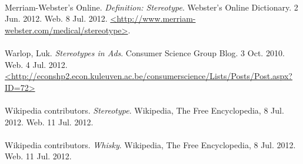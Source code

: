\paragraph{}
Merriam-Webster's Online. \emph{Definition: Stereotype}. Webster's Online Dictionary. 2 Jun. 2012. Web. 8 Jul. 2012. \url{<http://www.merriam-webster.com/medical/stereotype>}.
\paragraph{}
Warlop, Luk. \emph{Stereotypes in Ads}. Consumer Science Group Blog. 3 Oct. 2010. Web. 4 Jul. 2012. \url{<http://econshp2.econ.kuleuven.ac.be/consumerscience/Lists/Posts/Post.aspx?ID=72>}
\paragraph{}
Wikipedia contributors. \emph{Stereotype}. Wikipedia, The Free Encyclopedia, 8 Jul. 2012. Web. 11 Jul. 2012.
\paragraph{}
Wikipedia contributors. \emph{Whisky}. Wikipedia, The Free Encyclopedia, 8 Jul. 2012. Web. 11 Jul. 2012.
